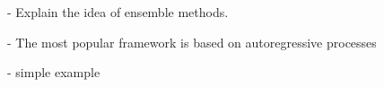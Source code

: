 - Explain the idea of ensemble methods.

- The most popular framework is based on
autoregressive processes

- simple example